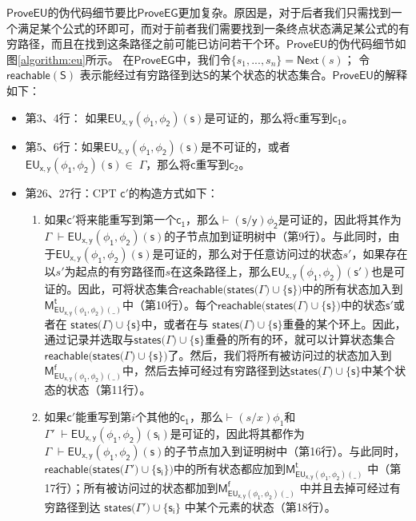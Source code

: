 $\mathsf{ProveEU}$的伪代码细节要比$\mathsf{ProveEG}$更加复杂。原因是，对于后者我们只需找到一个满足某个公式的环即可，而对于前者我们需要找到一条终点状态满足某公式的有穷路径，而且在找到这条路径之前可能已访问若干个环。$\mathsf{ProveEU}$的伪代码细节如图\ref{algorithm:eu}所示。
在$\mathsf{ProveEG}$中，我们令$\{s_1,...,s_n\}=\textsf{Next}(s)$；
令 $\mathsf{reachable(S)}$ 表示能经过有穷路径到达$\mathsf{S}$的某个状态的状态集合。$\mathsf{ProveEU}$的解释如下：
\begin{itemize}
	\item 第3、4行： 如果$\mathsf{EU_{x,y}(\phi_1,\phi_2)(s)}$是可证的，那么将$\mathsf{c}$重写到$\mathsf{c_1}$。
	\item 第5、6行：如果$\mathsf{EU_{x,y}(\phi_1,\phi_2)(s)}$是不可证的，或者$\mathsf{EU_{x,y}(\phi_1,\phi_2)(s)\in}\;\Gamma$，那么将$\mathsf{c}$重写到$\mathsf{c_2}$。
	\item 第26、27行：\textsf{CPT} $\mathsf{c'}$的构造方式如下：
	\begin{enumerate}
		\item 如果$\mathsf{c'}$将来能重写到第一个$\mathsf{c_1}$，那么$\mathsf{\vdash(s/y)\phi_2}$是可证的，因此将其作为$\Gamma\;\mathsf{\vdash EU_{x,y}(\phi_1,\phi_2)(s)}$的子节点加到证明树中（第9行）。与此同时，由于$\mathsf{EU_{x,y}(\phi_1,\phi_2)(s)}$是可证的，那么对于任意访问过的状态$s'$，如果存在以$s'$为起点的有穷路径而$s$在这条路径上，那么$\mathsf{EU_{x,y}(\phi_1,\phi_2)(s')}$也是可证的。因此，可将状态集合$\mathsf{reachable(states(}\Gamma\mathsf{)\cup\{s\})}$中的所有状态加入到 $\mathsf{M_{EU_{x,y}(\phi_1,\phi_2)(\_)}^t}$中（第10行）。每个$\mathsf{reachable(states(}\Gamma\mathsf{)\cup\{s\})}$中的状态$\mathsf{s'}$或者在 $\mathsf{states(}\Gamma\mathsf{)\cup\{s\}}$中，或者在与 $\mathsf{states(}\Gamma\mathsf{)\cup\{s\}}$重叠的某个环上。因此，通过记录并选取与$\mathsf{states(}\Gamma\mathsf{)\cup\{s\}}$重叠的所有的环，就可以计算状态集合 $\mathsf{reachable(states(}\Gamma\mathsf{)\cup\{s\})}$了。然后，我们将所有被访问过的状态加入到$\mathsf{M_{EU_{x,y}(\phi_1,\phi_2)(\_)}^f}$中，然后去掉可经过有穷路径到达$\mathsf{states(}\Gamma\mathsf{)\cup\{s\}}$中某个状态的状态（第11行）。
		\item 如果$\mathsf{c'}$能重写到第$i$个其他的$\mathsf{c_1}$，那么$\vdash(s/x)\phi_1$和 $\Gamma'\;\mathsf{\vdash EU_{x,y}(\phi_1,\phi_2)(s_i)}$是可证的，因此将其都作为$\Gamma\;\mathsf{\vdash EU_{x,y}(\phi_1,\phi_2)(s)}$的子节点加入到证明树中（第16行）。与此同时，$\mathsf{reachable(states(}\Gamma'\mathsf{)\cup\{s_i\})}$中的所有状态都应加到$\mathsf{M_{EU_{x,y}(\phi_1,\phi_2)(\_)}^t}$ 中（第17行）；所有被访问过的状态都加到$\mathsf{M_{EU_{x,y}(\phi_1,\phi_2)(\_)}^f}$ 中并且去掉可经过有穷路径到达 $\mathsf{states(}\Gamma'\mathsf{)\cup\{s_i\}}$ 中某个元素的状态（第18行）。 
		

\end{enumerate}
\end{itemize}
